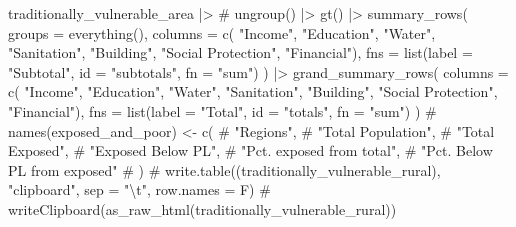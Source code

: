 \documentclass[
  letterpaper,
  DIV=11,
  numbers=noendperiod]{scrartcl}
\newenvironment{Shaded}{}{}
\newcommand{\AttributeTok}[1]{\textcolor[rgb]{0.84,0.23,0.29}{#1}}
\newcommand{\CommentTok}[1]{\textcolor[rgb]{0.42,0.45,0.49}{#1}}
\newcommand{\FunctionTok}[1]{\textcolor[rgb]{0.44,0.26,0.76}{#1}}
\newcommand{\NormalTok}[1]{\textcolor[rgb]{0.14,0.16,0.18}{#1}}
\newcommand{\SpecialCharTok}[1]{\textcolor[rgb]{0.00,0.36,0.77}{#1}}
\newcommand{\StringTok}[1]{\textcolor[rgb]{0.01,0.18,0.38}{#1}}
\begin{document}
\begin{Shaded}
\begin{Highlighting}[]
\NormalTok{traditionally\_vulnerable\_area }\SpecialCharTok{|\textgreater{}} 
  \CommentTok{\# ungroup() |\textgreater{}}
  \FunctionTok{gt}\NormalTok{() }\SpecialCharTok{|\textgreater{}} 
  \FunctionTok{summary\_rows}\NormalTok{(}
    \AttributeTok{groups =} \FunctionTok{everything}\NormalTok{(),}
    \AttributeTok{columns =} \FunctionTok{c}\NormalTok{(}
      \StringTok{"Income"}\NormalTok{, }\StringTok{"Education"}\NormalTok{, }
      \StringTok{"Water"}\NormalTok{, }\StringTok{"Sanitation"}\NormalTok{,}
      \StringTok{"Building"}\NormalTok{, }\StringTok{"Social Protection"}\NormalTok{, }
      \StringTok{"Financial"}\NormalTok{),}
    \AttributeTok{fns =} \FunctionTok{list}\NormalTok{(}\AttributeTok{label =} \StringTok{"Subtotal"}\NormalTok{, }\AttributeTok{id =} \StringTok{"subtotals"}\NormalTok{, }\AttributeTok{fn =} \StringTok{"sum"}\NormalTok{)}
\NormalTok{  ) }\SpecialCharTok{|\textgreater{}} 
  \FunctionTok{grand\_summary\_rows}\NormalTok{(}
    \AttributeTok{columns =} \FunctionTok{c}\NormalTok{(}
      \StringTok{"Income"}\NormalTok{, }\StringTok{"Education"}\NormalTok{, }
      \StringTok{"Water"}\NormalTok{, }\StringTok{"Sanitation"}\NormalTok{,}
      \StringTok{"Building"}\NormalTok{, }\StringTok{"Social Protection"}\NormalTok{, }
      \StringTok{"Financial"}\NormalTok{),}
    \AttributeTok{fns =} \FunctionTok{list}\NormalTok{(}\AttributeTok{label =} \StringTok{"Total"}\NormalTok{, }\AttributeTok{id =} \StringTok{"totals"}\NormalTok{, }\AttributeTok{fn =} \StringTok{"sum"}\NormalTok{)}
\NormalTok{  )}
\CommentTok{\# names(exposed\_and\_poor) \textless{}{-} c(}
\CommentTok{\#   "Regions",}
\CommentTok{\#   "Total Population",}
\CommentTok{\#   "Total Exposed",}
\CommentTok{\#   "Exposed Below PL",}
\CommentTok{\#   "Pct. exposed from total",}
\CommentTok{\#   "Pct. Below PL from exposed"}
\CommentTok{\# )}
\CommentTok{\# write.table((traditionally\_vulnerable\_rural), "clipboard", sep = "\textbackslash{}t", row.names = F)}
\CommentTok{\# writeClipboard(as\_raw\_html(traditionally\_vulnerable\_rural))}
\end{Highlighting}
\end{Shaded}
\end{document}

